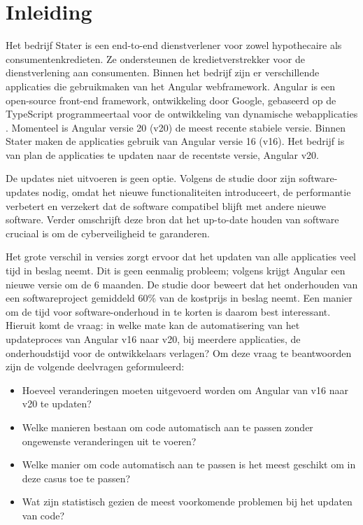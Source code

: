 
\section{Inleiding}
\label{sec:inleiding}

Het bedrijf Stater is een end-to-end dienstverlener voor zowel hypothecaire als consumentenkredieten.
Ze ondersteunen de kredietverstrekker voor de dienstverlening aan consumenten.
Binnen het bedrijf zijn er verschillende applicaties die gebruikmaken van het Angular webframework.
Angular is een open-source front-end framework, ontwikkeling door Google, gebaseerd op de TypeScript programmeertaal voor de ontwikkeling van dynamische webapplicaties \autocite{Cincovic2019}.
Momenteel is Angular versie 20 (v20) de meest recente stabiele versie.
Binnen Stater maken de applicaties gebruik van Angular versie 16 (v16).
Het bedrijf is van plan de applicaties te updaten naar de recentste versie, Angular v20.

De updates niet uitvoeren is geen optie.
Volgens de studie door \textcite{Vaniea2016} zijn software-updates nodig, omdat het nieuwe functionaliteiten introduceert, de performantie verbetert en verzekert dat de software compatibel blijft met andere nieuwe software.
Verder omschrijft deze bron dat het up-to-date houden van software cruciaal is om de cyberveiligheid te garanderen.

Het grote verschil in versies zorgt ervoor dat het updaten van alle applicaties veel tijd in beslag neemt.
Dit is geen eenmalig probleem; volgens \textcite{Callaghan2023} krijgt Angular een nieuwe versie om de 6 maanden.
De studie door \textcite{Kaur2015} beweert dat het onderhouden van een softwareproject gemiddeld 60\% van de kostprijs in beslag neemt.
Een manier om de tijd voor software-onderhoud in te korten is daarom best interessant.
Hieruit komt de vraag: in welke mate kan de automatisering van het updateproces van Angular v16 naar v20, bij meerdere applicaties, de onderhoudstijd voor de ontwikkelaars verlagen?
Om deze vraag te beantwoorden zijn de volgende deelvragen geformuleerd:
\begin{itemize}
  \item Hoeveel veranderingen moeten uitgevoerd worden om Angular van v16 naar v20 te updaten? 
  \item Welke manieren bestaan om code automatisch aan te passen zonder ongewenste veranderingen uit te voeren? 
  \item Welke manier om code automatisch aan te passen is het meest geschikt om in deze casus toe te passen?
  \item Wat zijn statistisch gezien de meest voorkomende problemen bij het updaten van code? 
\end{itemize}

